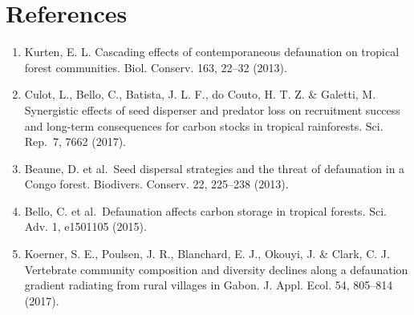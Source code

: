 \documentclass[
  12pt,
]{article}
\begin{document}
\newpage

\hypertarget{references}{%
\section{References}\label{references}}

\begin{enumerate}
\def\labelenumi{\arabic{enumi}.}
\item
  Kurten, E. L. Cascading effects of contemporaneous defaunation on
  tropical forest communities. Biol. Conserv. 163, 22--32 (2013).
\item
  Culot, L., Bello, C., Batista, J. L. F., do Couto, H. T. Z. \&
  Galetti, M. Synergistic effects of seed disperser and predator loss on
  recruitment success and long-term consequences for carbon stocks in
  tropical rainforests. Sci. Rep.~7, 7662 (2017).
\item
  Beaune, D. et al.~Seed dispersal strategies and the threat of
  defaunation in a Congo forest. Biodivers. Conserv. 22, 225--238
  (2013).
\item
  Bello, C. et al.~Defaunation affects carbon storage in tropical
  forests. Sci. Adv. 1, e1501105 (2015).
\item
  Koerner, S. E., Poulsen, J. R., Blanchard, E. J., Okouyi, J. \& Clark,
  C. J. Vertebrate community composition and diversity declines along a
  defaunation gradient radiating from rural villages in Gabon. J. Appl.
  Ecol. 54, 805--814 (2017).
\end{enumerate}
\end{document}
